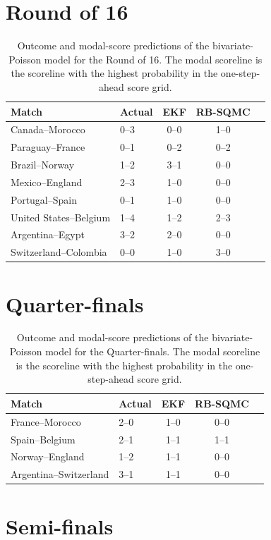 \section{Round of 16}

\begin{table}[H]
\centering
\begin{tabular}{llccc}
\toprule
Match & Actual & EKF & RB-SQMC \\
\midrule
Canada--Morocco & 0--3 & 0--0 & 1--0 \\
Paraguay--France & 0--1 & 0--2 & 0--2 \\
Brazil--Norway & 1--2 & 3--1 & 0--0 \\
Mexico--England & 2--3 & 1--0 & 0--0 \\
Portugal--Spain & 0--1 & 1--0 & 0--0 \\
United States--Belgium & 1--4 & 1--2 & 2--3 \\
Argentina--Egypt & 3--2 & 2--0 & 0--0 \\
Switzerland--Colombia & 0--0 & 1--0 & 3--0 \\
\bottomrule
\end{tabular}
\caption{Outcome and modal-score predictions of the bivariate-Poisson model for the Round of 16. The modal scoreline is the scoreline with the highest probability in the one-step-ahead score grid.}
\end{table}

\section{Quarter-finals}

\begin{table}[H]
\centering
\begin{tabular}{llccc}
\toprule
Match & Actual & EKF & RB-SQMC \\
\midrule
France--Morocco & 2--0 & 1--0 & 0--0 \\
Spain--Belgium & 2--1 & 1--1 & 1--1 \\
Norway--England & 1--2 & 1--1 & 0--0 \\
Argentina--Switzerland & 3--1 & 1--1 & 0--0 \\
\bottomrule
\end{tabular}
\caption{Outcome and modal-score predictions of the bivariate-Poisson model for the Quarter-finals. The modal scoreline is the scoreline with the highest probability in the one-step-ahead score grid.}
\end{table}

\section{Semi-finals}

